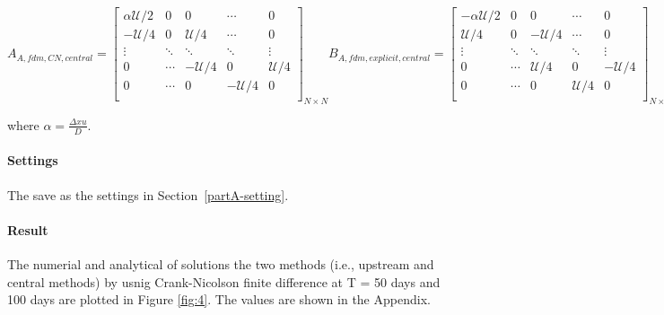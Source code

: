\begin{subequations}
  \begin{equation}
    A_{A,fdm,CN,central} = \begin{bmatrix}
      \alpha\mathcal{U}/2 & 0 & 0 & \cdots & 0 \\
      -\mathcal{U}/4 & 0 & \mathcal{U}/4 & \cdots & 0 \\
      \vdots & \ddots & \ddots & \ddots & \vdots \\
      0 & \cdots & -\mathcal{U}/4 & 0 & \mathcal{U}/4 \\
      0 & \cdots & 0 & -\mathcal{U}/4 & 0 \\
    \end{bmatrix}_{N\times N}
  \end{equation}
  \begin{equation}
    B_{A,fdm,explicit,central} = \begin{bmatrix}
      -\alpha\mathcal{U}/2 & 0 & 0 & \cdots & 0 \\
      \mathcal{U}/4 & 0 & -\mathcal{U}/4 & \cdots & 0 \\
      \vdots & \ddots & \ddots & \ddots & \vdots \\
      0 & \cdots & \mathcal{U}/4 & 0 & -\mathcal{U}/4 \\
      0 & \cdots & 0 & \mathcal{U}/4 & 0 \\
       \end{bmatrix}_{N\times N}
  \end{equation}
  \begin{equation}
    b_{fdm,explicit,central} = \{\alpha(2\mathcal{D}+\mathcal{U})c_{Feed}, 0, \dots, 0\}_{1\times N}^T
  \end{equation}
\end{subequations}

where $\alpha=\frac{\Delta xu}{D}$.

\paragraph{Settings} The save as the settings in Section~\ref{partA-setting}.

\paragraph{Result} The numerial and analytical of solutions the two methods (i.e., upstream and central methods) by usnig Crank-Nicolson finite difference at T = 50 days and 100 days are plotted in Figure \ref{fig:4}. The values are shown in the Appendix.

